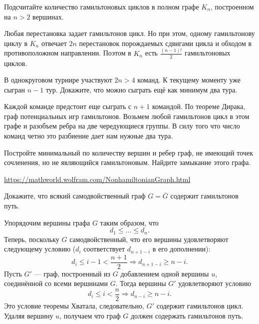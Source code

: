 \documentclass[a4paper,12pt,twoside]{article}
\begin{document}
\begin{?}
    Подсчитайте количество гамильтоновых циклов в полном графе $K_n$, построенном на $n > 2$ вершинах.
\end{?}
\begin{solution}{}
    Любая перестановка задает гамильтонов цикл. Но при этом, одному гамильтонову циклу в \(K_n\) отвечает \(2n\) перестановок порождаемых сдвигами цикла и обходом в противоположном направлении. Поэтом в \(K_n\) есть \(\frac{(n-1)!}{2}\) гамильтоновых циклов.
\end{solution}
\begin{?}
    В однокруговом турнире участвуют $2n > 4$ команд. К текущему моменту уже сыгран $n - 1$ тур. Докажите, что можно сыграть ещё как минимум два тура.
\end{?}
\begin{solution}{}
    Каждой команде предстоит еще сыграть с \(n+1\) командой. По теореме Дирака, граф потенциальных игр гамильтонов. Возьмем любой гамильтонов цикл в этом графе и разобъем ребра на две чередующиеся группы. В силу того что число команд четно это разбиение дает нам нужные два тура.
\end{solution}
\begin{?}
    Постройте минимальный по количеству вершин и ребер граф, не имеющий точек сочленения, но не являющийся гамильтоновым. Найдите замыкание этого графа.
\end{?}
\begin{solution}{}
    \url{https://mathworld.wolfram.com/NonhamiltonianGraph.html}
\end{solution}
\begin{?}
    Докажите, что всякий самодвойственный граф \(G = \overline{G}\) содержит гамильтонов путь.
\end{?}
\begin{solution}
    Упорядочим вершины графа \(G\) таким образом, что
    \[
        d_{1} \leq \ldots \leq d_{n}.
    \]
    Теперь, поскольку \(G\) самодвойственный, что его вершины удовлетворяют следующему условию (\(d_{i}\) соответствует \(d_{n+1-i}\) в его дополнении):
    \[
        d_{i} \leq i - 1 < \frac{n + 1}{2} \Rightarrow d_{n + 1 - i} \geq n - i.
    \]
    Пусть \(G'\) --- граф, построенный из \(G\) добавлением одной вершины \(u\), соединённой со всеми вершинами \(G\). Тогда вершины \(G'\) удовлетворяют условию
    \[
        d_{i} \leq i < \frac{n}{2} \Rightarrow d_{n - i} \geq n - i.
    \]
    Это условие теоремы Хватала, следовательно, \(G'\) содержит гамильтонов цикл. Удаляя вершину \(u\), получаем что граф \(G\) должен содержать гамильтонов путь.
\end{solution}
\end{document}
